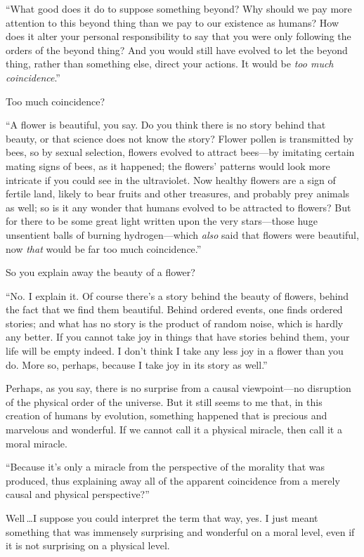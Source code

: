  ``What good does it do to suppose something
beyond? Why should we pay more attention to this beyond thing than we
pay to our existence as humans? How does it alter your personal
responsibility to say that you were only following the orders of the
beyond thing? And you would still have evolved to let the beyond thing,
rather than something else, direct your actions. It would be
\textit{too much coincidence}.''


 Too much coincidence?


 ``A flower is beautiful, you say. Do you think
there is no story behind that beauty, or that science does not know the
story? Flower pollen is transmitted by bees, so by sexual selection,
flowers evolved to attract bees---by imitating certain mating signs of
bees, as it happened; the flowers' patterns would look
more intricate if you could see in the ultraviolet. Now healthy flowers
are a sign of fertile land, likely to bear fruits and other treasures,
and probably prey animals as well; so is it any wonder that humans
evolved to be attracted to flowers? But for there to be some great
light written upon the very stars---those huge unsentient balls of
burning hydrogen---which \textit{also} said that flowers were
beautiful, now \textit{that} would be far too much
coincidence.''


 So you explain away the beauty of a flower?


 ``No. I explain it. Of course
there's a story behind the beauty of flowers, behind
the fact that we find them beautiful. Behind ordered events, one finds
ordered stories; and what has no story is the product of random noise,
which is hardly any better. If you cannot take joy in things that have
stories behind them, your life will be empty indeed. I
don't think I take any less joy in a flower than you
do. More so, perhaps, because I take joy in its story as
well.''


 Perhaps, as you say, there is no surprise from a causal
viewpoint---no disruption of the physical order of the universe. But it
still seems to me that, in this creation of humans by evolution,
something happened that is precious and marvelous and wonderful. If we
cannot call it a physical miracle, then call it a moral miracle.


 ``Because it's only a miracle
from the perspective of the morality that was produced, thus explaining
away all of the apparent coincidence from a merely causal and physical
perspective?''


 Well\,\ldots I suppose you could interpret the term that way, yes. I
just meant something that was immensely surprising and wonderful on a
moral level, even if it is not surprising on a physical level.


